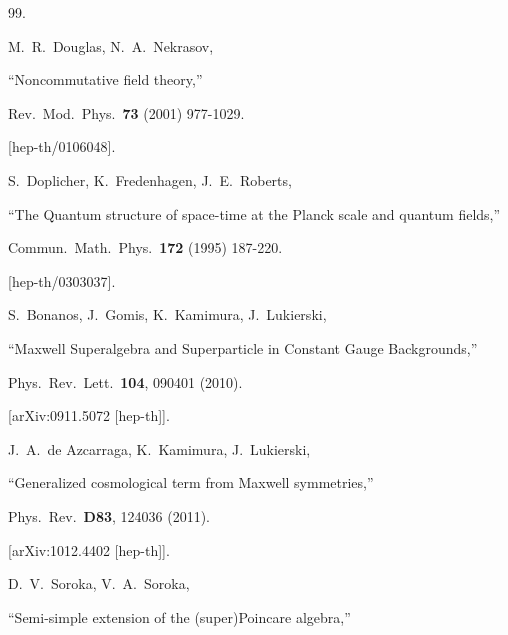 \documentclass [prd,reprint,eqsecnum,nofootinbib]  {revtex4-1}
\begin{document}
\begin{thebibliography}{99.}


  M.~R.~Douglas, N.~A.~Nekrasov,

  ``Noncommutative field theory,''

  Rev.\ Mod.\ Phys.\  {\bf 73 } (2001)  977-1029.

  [hep-th/0106048].





  S.~Doplicher, K.~Fredenhagen, J.~E.~Roberts,

  ``The Quantum structure of space-time at the Planck scale and quantum fields,''

  Commun.\ Math.\ Phys.\  {\bf 172 } (1995)  187-220.

  [hep-th/0303037].





  S.~Bonanos, J.~Gomis, K.~Kamimura, J.~Lukierski,

 ``Maxwell Superalgebra and Superparticle in Constant Gauge Backgrounds,''

  Phys.\ Rev.\ Lett.\  {\bf 104}, 090401 (2010).

  [arXiv:0911.5072 [hep-th]].





  J.~A.~de Azcarraga, K.~Kamimura, J.~Lukierski,

  ``Generalized cosmological term from Maxwell symmetries,''

  Phys.\ Rev.\  {\bf D83}, 124036 (2011).

  [arXiv:1012.4402 [hep-th]].















  D.~V.~Soroka, V.~A.~Soroka,

  ``Semi-simple extension of the (super)Poincare algebra,''


\end{thebibliography}
\end{document}
